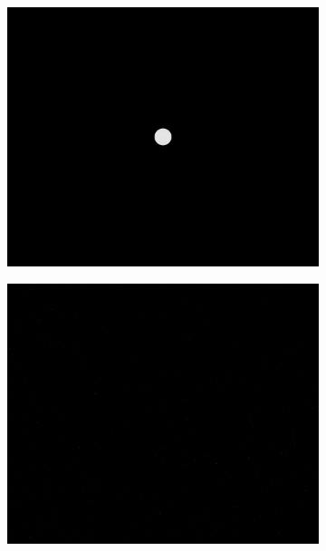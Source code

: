 \begin{figure}[htb]
\begin{subfigure}[b]{0.47\textwidth}
        \caption{}
        \label{fig:comp_sssbconstdist}
    \end{subfigure}
    \\
    \begin{subfigure}[b]{0.47\textwidth}
        \centering
        \includegraphics[width=\textwidth]{doc/thesis/0_figures/composition/LightRef_2017-08-15T115855-684000.png}
        \caption{}
        \label{fig:comp_lightref}
    \end{subfigure}
    \begin{subfigure}[b]{0.47\textwidth}
        \centering
        \includegraphics[width=\textwidth]{doc/thesis/0_figures/composition/Stars_2017-08-15T115855-684000.png}

\end{subfigure}
\end{figure}
